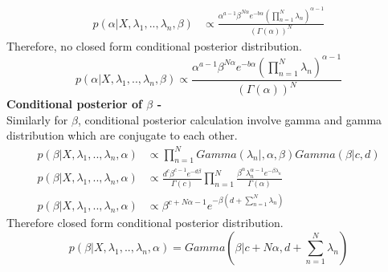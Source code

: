 \documentclass[a4paper,11pt]{article}
\begin{document}
\begin{pmisolution}
\begin{align*}
    p(\alpha|X,\lambda_{1},..,\lambda_n,\beta) &\propto \frac{\alpha^{a-1}\beta^{N\alpha}e^{-b\alpha}\left(\prod_{n=1}^{N}\lambda_n\right)^{\alpha-1}}{(\Gamma(\alpha))^N}
\end{align*}
Therefore, no closed form conditional posterior distribution.
\[p(\alpha|X,\lambda_{1},..,\lambda_n,\beta) \propto \frac{\alpha^{a-1}\beta^{N\alpha}e^{-b\alpha}\left(\prod_{n=1}^{N}\lambda_n\right)^{\alpha-1}}{(\Gamma(\alpha))^N}\]
\textbf{Conditional posterior of \(\beta\) -}\\
Similarly for \(\beta\), conditional posterior calculation involve gamma and gamma distribution which are conjugate to each other.\\
\begin{align*}
    p(\beta|X,\lambda_{1},..,\lambda_n,\alpha) &\propto \prod_{n=1}^{N}Gamma(\lambda_n|,\alpha,\beta)Gamma(\beta|c,d)\\
    p(\beta|X,\lambda_{1},..,\lambda_n,\alpha) &\propto \frac{d^{c}\beta^{c-1}e^{-d\beta}}{\Gamma(c)}\prod_{n=1}^{N} \frac{\beta^{\alpha}\lambda_n^{\alpha-1}e^{-\beta\lambda_n}}{\Gamma(\alpha)}\\
    p(\beta|X,\lambda_{1},..,\lambda_n,\alpha) &\propto \beta^{c + N\alpha -1} e^{-\beta(d + \sum_{n=1}^{N}\lambda_n)}
\end{align*}
Therefore closed form conditional posterior distribution.
\[ p(\beta|X,\lambda_{1},..,\lambda_n,\alpha) = Gamma(\beta | c + N\alpha, d + \sum_{n=1}^{N}\lambda_n)\]
\end{pmisolution}
\end{document}
